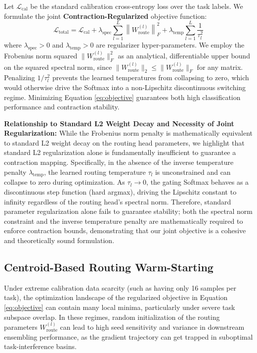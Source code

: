Let $\mathcal{L}_{\text{cal}}$ be the standard calibration cross-entropy loss over the task labels. We formulate the joint \textbf{Contraction-Regularized} objective function:
\begin{equation}
\label{eq:objective}
\mathcal{L}_{\text{total}} = \mathcal{L}_{\text{cal}} + \lambda_{\text{spec}} \sum_{l=1}^L \left\| W_{\text{route}}^{(l)} \right\|_F^2 + \lambda_{\text{temp}} \sum_{l=1}^L \frac{1}{\tau_l^2}
\end{equation}
where $\lambda_{\text{spec}} > 0$ and $\lambda_{\text{temp}} > 0$ are regularizer hyper-parameters. We employ the Frobenius norm squared $\|W_{\text{route}}^{(l)}\|_F^2$ as an analytical, differentiable upper bound on the squared spectral norm, since $\|W_{\text{route}}^{(l)}\|_2 \le \|W_{\text{route}}^{(l)}\|_F$ for any matrix. Penalizing $1/\tau_l^2$ prevents the learned temperatures from collapsing to zero, which would otherwise drive the Softmax into a non-Lipschitz discontinuous switching regime. Minimizing Equation \ref{eq:objective} guarantees both high classification performance and contraction stability.

\textbf{Relationship to Standard L2 Weight Decay and Necessity of Joint Regularization:}
While the Frobenius norm penalty is mathematically equivalent to standard L2 weight decay on the routing head parameters, we highlight that standard L2 regularization alone is fundamentally insufficient to guarantee a contraction mapping. Specifically, in the absence of the inverse temperature penalty $\lambda_{\text{temp}}$, the learned routing temperature $\tau_l$ is unconstrained and can collapse to zero during optimization. As $\tau_l \to 0$, the gating Softmax behaves as a discontinuous step function (hard argmax), driving the Lipschitz constant to infinity regardless of the routing head's spectral norm. Therefore, standard parameter regularization alone fails to guarantee stability; both the spectral norm constraint and the inverse temperature penalty are mathematically required to enforce contraction bounds, demonstrating that our joint objective is a cohesive and theoretically sound formulation.

\subsection{Centroid-Based Routing Warm-Starting}
Under extreme calibration data scarcity (such as having only 16 samples per task), the optimization landscape of the regularized objective in Equation \ref{eq:objective} can contain many local minima, particularly under severe task subspace overlap. In these regimes, random initialization of the routing parameters $W_{\text{route}}^{(l)}$ can lead to high seed sensitivity and variance in downstream ensembling performance, as the gradient trajectory can get trapped in suboptimal task-interference basins.


